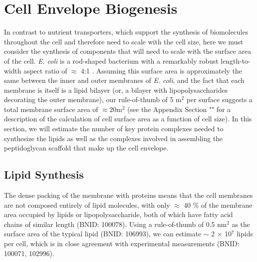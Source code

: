 \section{Cell Envelope Biogenesis}
In contrast to nutrient transporters, which support the synthesis of
biomolecules throughout the cell and therefore need to scale with the cell
size, here we must consider the synthesis of components that will need to
scale with the surface area of the cell. \textit{E. coli} is a rod-shaped
bacterium with a remarkably robust length-to-width aspect ratio of $\approx$
4:1 \citep{harris2018, ojkic2019}. Assuming this surface area is
approximately the same between the inner and outer membranes of \textit{E.
coli}, and the fact that each membrane is itself is a lipid bilayer (or, a
bilayer with lipopolysaccharides decorating the outer membrane), our rule-of-thumb
of 5 \textmu m$^2$ per surface suggests a total membrane surface area of
$\approx 20 $\textmu m$^2$ (see the Appendix Section
"" for a description of the calculation of cell
surface area as a function of cell size). In this section, we will estimate
the number of key protein complexes needed to synthesize the lipids as well
as the complexes involved in assembling the peptidoglycan scaffold that make
up the cell envelope.

\subsection{Lipid Synthesis}
The dense packing of the membrane with proteins means that the cell membranes
are not composed entirely of lipid molecules, with only $\approx$ 40 \% of the
membrane area occupied by lipids or lipopolysaccharide, both of which have fatty 
acid chains of similar length (BNID: 100078). Using a rule-of-thumb of 0.5
nm$^2$ as the surface area of the typical lipid (BNID: 106993), we can
estimate $\sim$ 2 $\times$ 10$^7$ lipids per cell, which is in close
agreement with experimental measurements (BNID: 100071, 102996).

